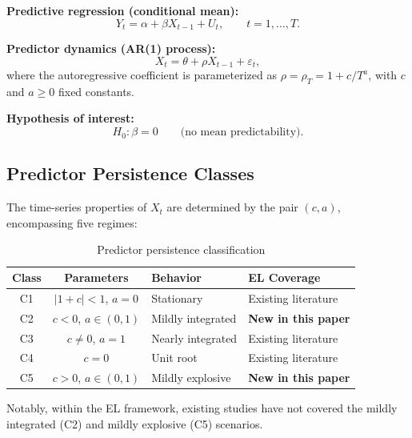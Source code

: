 \documentclass[11pt,a4paper]{article}
\theoremstyle{definition}
\theoremstyle{remark}
\begin{document}
\medskip
\noindent\textbf{Predictive regression (conditional mean):}
\begin{equation}\label{eq:mean}
    Y_t = \alpha + \beta X_{t-1} + U_t, \qquad t = 1, \ldots, T.
\end{equation}

\noindent\textbf{Predictor dynamics (AR(1) process):}
\begin{equation}\label{eq:ar}
    X_t = \theta + \rho X_{t-1} + \varepsilon_t,
\end{equation}
where the autoregressive coefficient is parameterized as
$\rho = \rho_T = 1 + c/T^a$, with $c$ and $a \geq 0$ fixed constants.

\medskip
\noindent\textbf{Hypothesis of interest:}
\begin{equation}\label{eq:null}
    H_0: \beta = 0 \qquad \text{(no mean predictability)}.
\end{equation}

\subsection{Predictor Persistence Classes}

The time-series properties of $X_t$ are determined by the pair $(c, a)$,
encompassing five regimes:

\begin{table}[H]
\centering
\caption{Predictor persistence classification}
\label{tab:persistence}
\begin{tabular}{ccll}
\toprule
\textbf{Class} & \textbf{Parameters} & \textbf{Behavior} & \textbf{EL Coverage} \\
\midrule
C1 & $|1+c| < 1$, $a = 0$       & Stationary            & Existing literature \\
C2 & $c < 0$, $a \in (0,1)$     & Mildly integrated     & \textbf{New in this paper} \\
C3 & $c \neq 0$, $a = 1$        & Nearly integrated     & Existing literature \\
C4 & $c = 0$                     & Unit root             & Existing literature \\
C5 & $c > 0$, $a \in (0,1)$     & Mildly explosive      & \textbf{New in this paper} \\
\bottomrule
\end{tabular}
\end{table}

Notably, within the EL framework, existing studies have not covered the mildly integrated
(C2) and mildly explosive (C5) scenarios.
\end{document}
